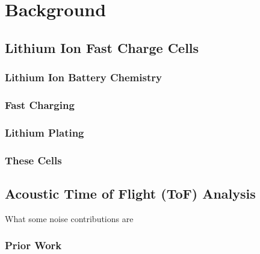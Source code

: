 \chapter{Background}

\section{Lithium Ion Fast Charge Cells}

\subsection{Lithium Ion Battery Chemistry}

\subsection{Fast Charging}

\subsection{Lithium Plating}

\subsection{These Cells}


\section{Acoustic Time of Flight (ToF) Analysis}



What some noise contributions are

\subsection{Prior Work}